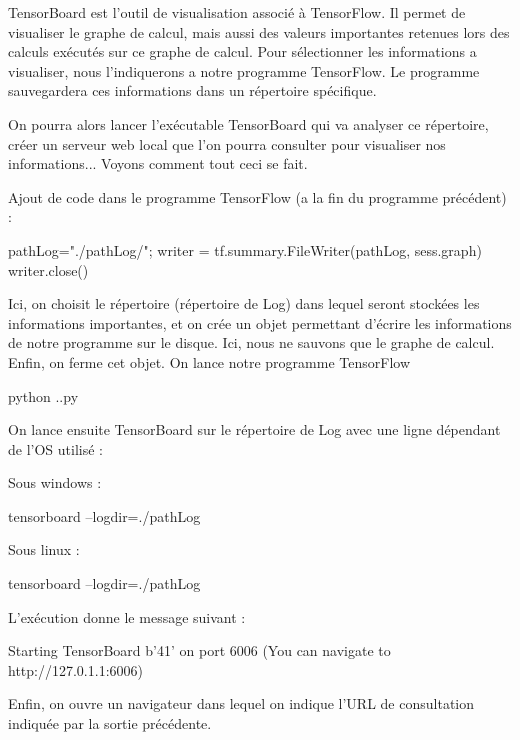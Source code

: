 \documentclass[a4paper,11pt]{book}
\begin{document}
TensorBoard est l'outil de visualisation associé à TensorFlow. Il permet de visualiser le graphe de calcul, mais aussi des valeurs importantes retenues lors des calculs exécutés sur ce graphe de calcul.
Pour sélectionner les informations a visualiser, nous l'indiquerons a notre programme TensorFlow. Le programme sauvegardera ces informations dans un répertoire spécifique.

On pourra alors lancer l'exécutable TensorBoard qui va analyser ce répertoire, créer un serveur web local que l'on pourra consulter pour visualiser nos informations...
Voyons comment tout ceci se fait.


Ajout de code dans le programme TensorFlow (a la fin du programme précédent) :
\begin{mypython}
pathLog="./pathLog/";
writer = tf.summary.FileWriter(pathLog, sess.graph)
writer.close()
\end{mypython}
Ici, on choisit le répertoire (répertoire de Log) dans lequel seront stockées les informations importantes, et on crée un objet permettant d'écrire les informations de notre programme sur le disque. Ici, nous ne sauvons que le graphe de calcul. Enfin, on ferme cet objet.
On lance notre programme TensorFlow 
\begin{mybash}
python .\premiersPas.py
\end{mybash}
On lance ensuite TensorBoard sur le répertoire de Log avec une ligne dépendant de l'OS utilisé :

Sous windows :
\begin{mybash}
tensorboard --logdir=./pathLog
\end{mybash}
Sous linux :
\begin{mybash}
tensorboard --logdir=./pathLog
\end{mybash}

L’exécution donne le message suivant :
\begin{myoutput}
Starting TensorBoard b'41' on port 6006
(You can navigate to http://127.0.1.1:6006)
\end{myoutput}


Enfin, on ouvre un navigateur dans lequel on indique l'URL de consultation indiquée par la sortie précédente.
\end{document}
